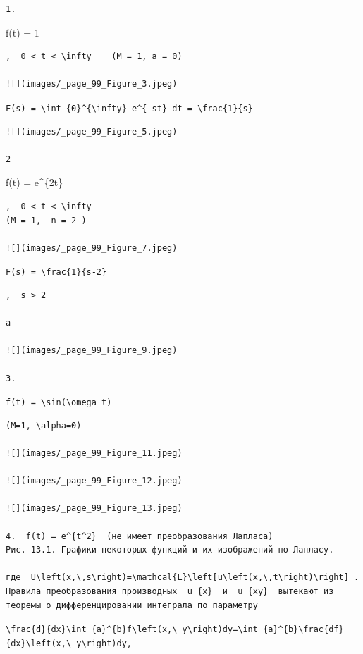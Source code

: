 \documentclass[
  ukrainian,
]{article}
\begin{document}
\begin{verbatim}
1.
\end{verbatim}

f(t) = 1

\begin{verbatim}
,  0 < t < \infty    (M = 1, a = 0)

![](images/_page_99_Figure_3.jpeg)
\end{verbatim}

\texttt{F(s)\ =\ \textbackslash{}int\_\{0\}\^{}\{\textbackslash{}infty\}\ e\^{}\{-st\}\ dt\ =\ \textbackslash{}frac\{1\}\{s\}}

\begin{verbatim}
![](images/_page_99_Figure_5.jpeg)

2
\end{verbatim}

f(t) = e\^{}\{2t\}

\begin{verbatim}
,  0 < t < \infty   
(M = 1,  n = 2 )

![](images/_page_99_Figure_7.jpeg)
\end{verbatim}

\texttt{F(s)\ =\ \textbackslash{}frac\{1\}\{s-2\}}

\begin{verbatim}
,  s > 2 

a

![](images/_page_99_Figure_9.jpeg)

3.
\end{verbatim}

\texttt{f(t)\ =\ \textbackslash{}sin(\textbackslash{}omega\ t)}

\begin{verbatim}
(M=1, \alpha=0)

![](images/_page_99_Figure_11.jpeg)

![](images/_page_99_Figure_12.jpeg)

![](images/_page_99_Figure_13.jpeg)

4.  f(t) = e^{t^2}  (не имеет преобразования Лапласа)
Рис. 13.1. Графики некоторых функций и их изображений по Лапласу.

где  U\left(x,\,s\right)=\mathcal{L}\left[u\left(x,\,t\right)\right] . Правила преобразования производных  u_{x}  и  u_{xy}  вытекают из теоремы о дифференцировании интеграла по параметру
\end{verbatim}

\texttt{\textbackslash{}frac\{d\}\{dx\}\textbackslash{}int\_\{a\}\^{}\{b\}f\textbackslash{}left(x,\textbackslash{}\ y\textbackslash{}right)dy=\textbackslash{}int\_\{a\}\^{}\{b\}\textbackslash{}frac\{df\}\{dx\}\textbackslash{}left(x,\textbackslash{}\ y\textbackslash{}right)dy,}
\end{document}
